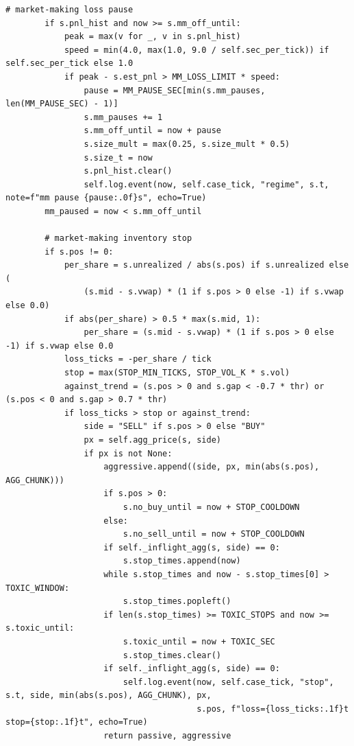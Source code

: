 \begin{lstlisting}[style=algocode]
        # market-making loss pause
        if s.pnl_hist and now >= s.mm_off_until:
            peak = max(v for _, v in s.pnl_hist)
            speed = min(4.0, max(1.0, 9.0 / self.sec_per_tick)) if self.sec_per_tick else 1.0
            if peak - s.est_pnl > MM_LOSS_LIMIT * speed:
                pause = MM_PAUSE_SEC[min(s.mm_pauses, len(MM_PAUSE_SEC) - 1)]
                s.mm_pauses += 1
                s.mm_off_until = now + pause
                s.size_mult = max(0.25, s.size_mult * 0.5)
                s.size_t = now
                s.pnl_hist.clear()
                self.log.event(now, self.case_tick, "regime", s.t, note=f"mm pause {pause:.0f}s", echo=True)
        mm_paused = now < s.mm_off_until

        # market-making inventory stop
        if s.pos != 0:
            per_share = s.unrealized / abs(s.pos) if s.unrealized else (
                (s.mid - s.vwap) * (1 if s.pos > 0 else -1) if s.vwap else 0.0)
            if abs(per_share) > 0.5 * max(s.mid, 1):
                per_share = (s.mid - s.vwap) * (1 if s.pos > 0 else -1) if s.vwap else 0.0
            loss_ticks = -per_share / tick
            stop = max(STOP_MIN_TICKS, STOP_VOL_K * s.vol)
            against_trend = (s.pos > 0 and s.gap < -0.7 * thr) or (s.pos < 0 and s.gap > 0.7 * thr)
            if loss_ticks > stop or against_trend:
                side = "SELL" if s.pos > 0 else "BUY"
                px = self.agg_price(s, side)
                if px is not None:
                    aggressive.append((side, px, min(abs(s.pos), AGG_CHUNK)))
                    if s.pos > 0:
                        s.no_buy_until = now + STOP_COOLDOWN
                    else:
                        s.no_sell_until = now + STOP_COOLDOWN
                    if self._inflight_agg(s, side) == 0:
                        s.stop_times.append(now)
                    while s.stop_times and now - s.stop_times[0] > TOXIC_WINDOW:
                        s.stop_times.popleft()
                    if len(s.stop_times) >= TOXIC_STOPS and now >= s.toxic_until:
                        s.toxic_until = now + TOXIC_SEC
                        s.stop_times.clear()
                    if self._inflight_agg(s, side) == 0:
                        self.log.event(now, self.case_tick, "stop", s.t, side, min(abs(s.pos), AGG_CHUNK), px,
                                       s.pos, f"loss={loss_ticks:.1f}t stop={stop:.1f}t", echo=True)
                    return passive, aggressive


\end{lstlisting}
